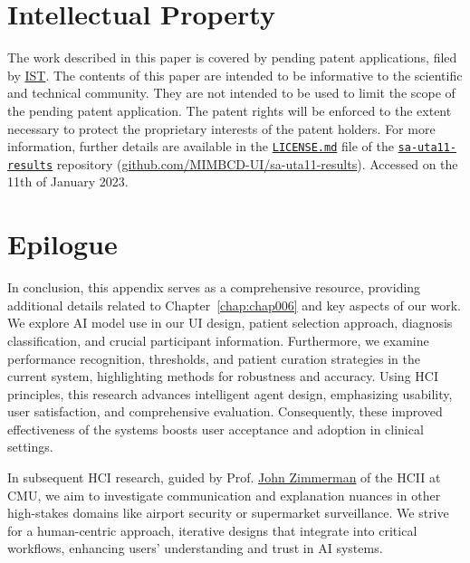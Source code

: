 \section{Intellectual Property}
\label{sec:app005017}

The work described in this paper is covered by pending patent applications, filed by \href{https://tecnico.ulisboa.pt}{\acl{IST}}.
The contents of this paper are intended to be informative to the scientific and technical community.
They are not intended to be used to limit the scope of the pending patent application.
The patent rights will be enforced to the extent necessary to protect the proprietary interests of the patent holders.
For more information, further details are available in the \texttt{\href{https://github.com/MIMBCD-UI/sa-uta11-results/blob/main/LICENSE.md}{LICENSE.md}} file of the \texttt{\href{https://github.com/MIMBCD-UI/sa-uta11-results}{sa-uta11-results}} repository (\href{https://github.com/MIMBCD-UI/sa-uta11-results}{github.com/MIMBCD-UI/sa-uta11-results}).
Accessed on the 11th of January 2023.

\section{Epilogue}
\label{sec:app005018}

In conclusion, this appendix serves as a comprehensive resource, providing additional details related to Chapter~\ref{chap:chap006} and key aspects of our work.
We explore \ac{AI} model use in our \ac{UI} design, patient selection approach, diagnosis classification, and crucial participant information.
Furthermore, we examine performance recognition, thresholds, and patient curation strategies in the current system, highlighting methods for robustness and accuracy.
Using \ac{HCI} principles, this research advances intelligent agent design, emphasizing usability, user satisfaction, and comprehensive evaluation.
Consequently, these improved effectiveness of the systems boosts user acceptance and adoption in clinical settings.

In subsequent \ac{HCI} research, guided by Prof. \href{https://www.hcii.cmu.edu/people/john-zimmerman}{John Zimmerman} of the \ac{HCII} at \ac{CMU}, we aim to investigate communication and explanation nuances in other high-stakes domains like airport security or supermarket surveillance.
We strive for a human-centric approach, iterative designs that integrate into critical workflows, enhancing users' understanding and trust in \ac{AI} systems.

